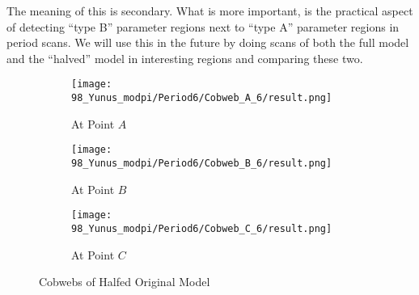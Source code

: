The meaning of this is secondary.
What is more important, is the practical aspect of detecting ``type B'' parameter regions next to ``type A'' parameter regions in period scans.
We will use this in the future by doing scans of both the full model and the ``halved'' model in interesting regions and comparing these two.


\begin{figure}
    \centering
    \begin{subfigure}{0.3\textwidth}
        \centering
        \texttt{[image: 98\_Yunus\_modpi/Period6/Cobweb\_A\_6/result.png]}
        \caption{At Point $A$}
        \label{fig:yunus.pi.CobwebA6}
    \end{subfigure}
    \begin{subfigure}{0.3\textwidth}
        \centering
        \texttt{[image: 98\_Yunus\_modpi/Period6/Cobweb\_B\_6/result.png]}
        \caption{At Point $B$}
        \label{fig:yunus.pi.CobwebB6}
    \end{subfigure}
    \begin{subfigure}{0.3\textwidth}
        \centering
        \texttt{[image: 98\_Yunus\_modpi/Period6/Cobweb\_C\_6/result.png]}
        \caption{At Point $C$}
        \label{fig:yunus.pi.CobwebC6}
    \end{subfigure}
    \caption{Cobwebs of Halfed Original Model}
\end{figure}
